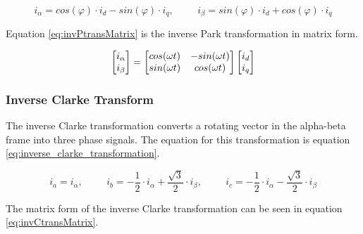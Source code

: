 \begin{equation}
    i_{\alpha} = cos(\varphi) \cdot i_{d} - sin(\varphi) \cdot i_{q}
    , \hspace{1cm}
    i_{\beta} = sin(\varphi) \cdot i_{d} + cos(\varphi) \cdot i_{q}
    \label{eq:inverse_park_transformation}
\end{equation}

Equation \ref{eq:invPtransMatrix} is the inverse Park transformation in matrix form.

\begin{equation}
    \centering
    \begin{bmatrix}
        i_{\alpha} \\ 
        i_{\beta}
    \end{bmatrix}
    =
    \begin{bmatrix}
       cos(\omega t) & -sin(\omega t) \\
       sin(\omega t) & cos(\omega t)
    \end{bmatrix}
    \begin{bmatrix}
        i_{d} \\ 
        i_{q}
    \end{bmatrix}
    \label{eq:invPtransMatrix}
\end{equation}
\subsubsection{Inverse Clarke Transform}
The inverse Clarke transformation converts a rotating vector in the alpha-beta frame into three phase signals. The equation for this transformation is equation \ref{eq:inverse_clarke_transformation}.

\begin{equation}
    i_{a} = i_{\alpha}
    , \hspace{1cm}
    i_{b} = -\frac{1}{2} \cdot i_{\alpha} + \frac{\sqrt{3}}{2} \cdot i_{\beta}
    , \hspace{1cm}
    i_{c} = -\frac{1}{2} \cdot i_{\alpha} - \frac{\sqrt{3}}{2} \cdot i_{\beta}
    \label{eq:inverse_clarke_transformation}
\end{equation}

The matrix form of the inverse Clarke transformation can be seen in equation \ref{eq:invCtransMatrix}.


